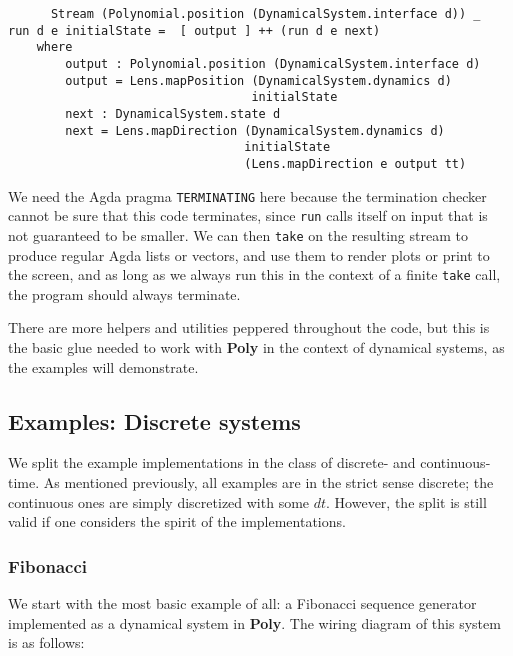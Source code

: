 \begin{itemize}
\begin{verbatim}
      Stream (Polynomial.position (DynamicalSystem.interface d)) _
run d e initialState =  [ output ] ++ (run d e next)
    where
        output : Polynomial.position (DynamicalSystem.interface d)
        output = Lens.mapPosition (DynamicalSystem.dynamics d) 
                                  initialState
        next : DynamicalSystem.state d
        next = Lens.mapDirection (DynamicalSystem.dynamics d) 
                                 initialState
                                 (Lens.mapDirection e output tt)
\end{verbatim}
    We need the Agda pragma \texttt{TERMINATING} here because the termination checker cannot be sure that this code terminates, since \texttt{run} calls itself on input that is not guaranteed to be smaller. We can then \texttt{take} on the resulting stream to produce regular Agda lists or vectors, and use them to render plots or print to the screen, and as long as we always run this in the context of a finite \texttt{take} call, the program should always terminate.
\end{itemize}
There are more helpers and utilities peppered throughout the code, but this is the basic glue needed to work with \textbf{Poly} in the context of dynamical systems, as the examples will demonstrate.


\subsection{Examples: Discrete systems}

We split the example implementations in the class of discrete- and continuous-time. As mentioned previously, all examples are in the strict sense discrete; the continuous ones are simply discretized with some $dt$. However, the split is still valid if one considers the spirit of the implementations.

\subsubsection{Fibonacci}
\label{section:fib}
We start with the most basic example of all: a Fibonacci sequence generator implemented as a dynamical system in \textbf{Poly}. The wiring diagram of this system is as follows:


